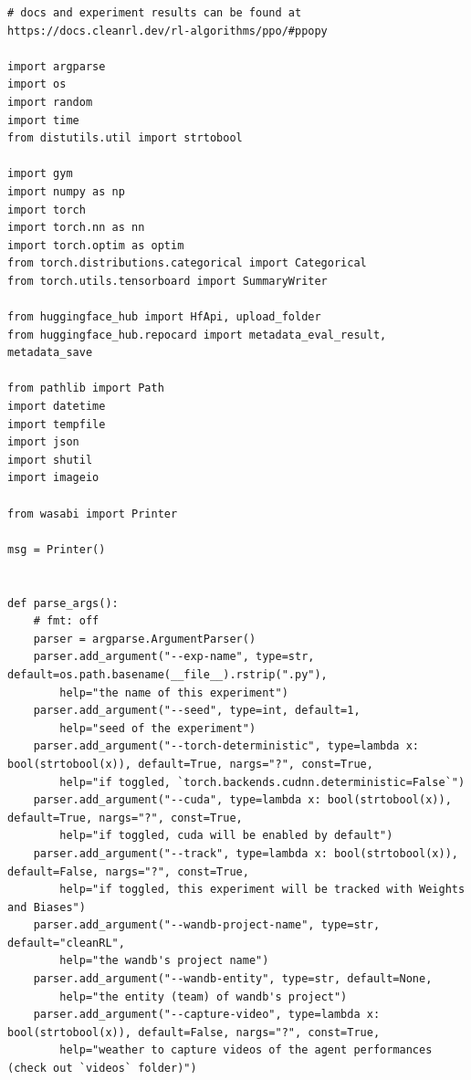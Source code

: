 \documentclass[11pt,a4paper]{article}
\begin{document}
\begin{lstlisting}
# docs and experiment results can be found at https://docs.cleanrl.dev/rl-algorithms/ppo/#ppopy

import argparse
import os
import random
import time
from distutils.util import strtobool

import gym
import numpy as np
import torch
import torch.nn as nn
import torch.optim as optim
from torch.distributions.categorical import Categorical
from torch.utils.tensorboard import SummaryWriter

from huggingface_hub import HfApi, upload_folder
from huggingface_hub.repocard import metadata_eval_result, metadata_save

from pathlib import Path
import datetime
import tempfile
import json
import shutil
import imageio

from wasabi import Printer

msg = Printer()


def parse_args():
    # fmt: off
    parser = argparse.ArgumentParser()
    parser.add_argument("--exp-name", type=str, default=os.path.basename(__file__).rstrip(".py"),
        help="the name of this experiment")
    parser.add_argument("--seed", type=int, default=1,
        help="seed of the experiment")
    parser.add_argument("--torch-deterministic", type=lambda x: bool(strtobool(x)), default=True, nargs="?", const=True,
        help="if toggled, `torch.backends.cudnn.deterministic=False`")
    parser.add_argument("--cuda", type=lambda x: bool(strtobool(x)), default=True, nargs="?", const=True,
        help="if toggled, cuda will be enabled by default")
    parser.add_argument("--track", type=lambda x: bool(strtobool(x)), default=False, nargs="?", const=True,
        help="if toggled, this experiment will be tracked with Weights and Biases")
    parser.add_argument("--wandb-project-name", type=str, default="cleanRL",
        help="the wandb's project name")
    parser.add_argument("--wandb-entity", type=str, default=None,
        help="the entity (team) of wandb's project")
    parser.add_argument("--capture-video", type=lambda x: bool(strtobool(x)), default=False, nargs="?", const=True,
        help="weather to capture videos of the agent performances (check out `videos` folder)")


\end{lstlisting}
\end{document}
